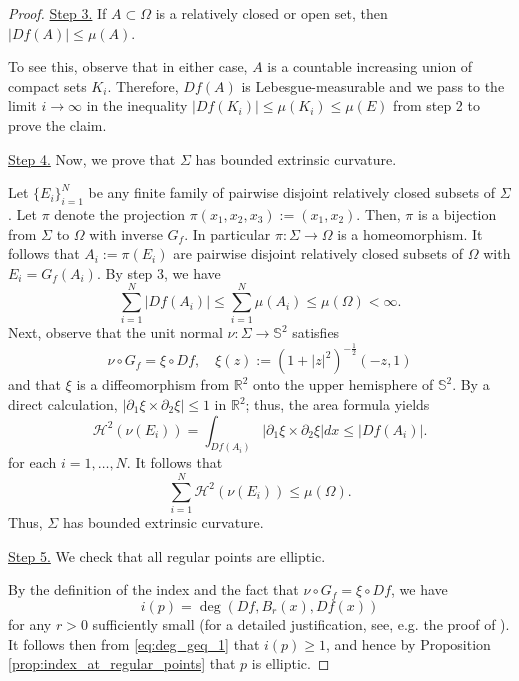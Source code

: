 \documentclass[12pt]{article}
\newcommand{\R}{\mathbb{R}}
\theoremstyle{plain}
\numberwithin{equation}{section}
\begin{document}
\begin{proof}
\medskip
 \noindent\underline{Step 3.} If $A \subset \Omega$ is a relatively closed or open set, then $|Df(A)| \leq \mu(A)$. 
 
 To see this, observe that in either case, $A$ is a countable increasing union of compact sets $K_i$. Therefore, $Df(A)$ is Lebesgue-measurable and we pass to the limit $i \to \infty$ in the inequality $|Df(K_i)| \leq \mu(K_i) \leq \mu(E)$ from step 2 to prove the claim.

\medskip
 \noindent\underline{Step 4.}  Now, we prove that $\Sigma$ has bounded extrinsic curvature.
 
Let $\{E_i\}_{i=1}^N$ be any finite family of pairwise disjoint relatively closed subsets of $\Sigma$. Let $\pi$ denote the projection $\pi(x_1,x_2,x_3):=(x_1,x_2)$. Then, $\pi$ is a bijection from $\Sigma$ to $\Omega$ with inverse $G_f$. In particular $\pi : \Sigma \to \Omega$ is a homeomorphism. It follows that $A_i := \pi(E_i)$ are pairwise disjoint relatively closed subsets of $\Omega$ with $E_i = G_f(A_i)$. By step 3, we have
        \begin{equation*}
            \sum_{i=1}^N |Df(A_i)| \leq \sum_{i=1}^N \mu(A_i) \leq \mu(\Omega) < \infty.
        \end{equation*}
        Next, observe that the unit normal $\nu : \Sigma \to \mathbb{S}^2$ satisfies
        \begin{equation*}
            \nu \circ G_f = \xi\circ Df, \quad \xi(z):=(1+|z|^2)^{-\frac12}(-z,1)
        \end{equation*}
        and that $\xi$ is a diffeomorphism from $\R^2$ onto the upper hemisphere of $\mathbb{S}^2$. By a direct calculation, $|\partial_1 \xi \times \partial_2 \xi| \leq 1$ in $\R^2$; thus, the area formula yields
        \begin{equation*}
            \mathcal{H}^2(\nu(E_i)) = \int_{Df(A_i)} |\partial_1 \xi \times \partial_2 \xi|dx \leq |Df(A_i)|.
        \end{equation*}
        for each $i=1,\dots,N$. It follows that
        \begin{equation*}
            \sum_{i=1}^N \mathcal{H}^2(\nu(E_i)) \le \mu(\Omega).
        \end{equation*}
        Thus, $\Sigma$ has bounded extrinsic curvature. 

\medskip
 \noindent\underline{Step 5.} We check that all regular points are elliptic. 
 
 By the definition of the index and the fact that $\nu \circ G_f = \xi \circ Df$, we have
            \begin{equation*}
                i(p) = \deg(Df, B_r(x), Df(x))
            \end{equation*}
            for any $r>0$ sufficiently small (for a detailed justification, see, e.g. the proof of \cite[Proposition 3.1]{pakzad_24}). It follows then from \eqref{eq:deg_geq_1} that $i(p) \geq 1$, and hence by Proposition \ref{prop:index_at_regular_points} that $p$ is elliptic.
\end{proof}
\end{document}
